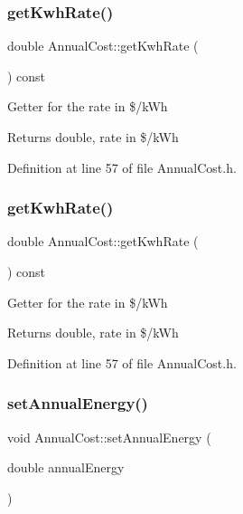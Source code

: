 \subsubsection{\texorpdfstring{get\+Kwh\+Rate()}{getKwhRate()}\hspace{0.1cm}{\footnotesize\ttfamily [2/3]}}
{\footnotesize\ttfamily double Annual\+Cost\+::get\+Kwh\+Rate (\begin{DoxyParamCaption}{ }\end{DoxyParamCaption}) const\hspace{0.3cm}{\ttfamily [inline]}}

Getter for the rate in \$/k\+Wh \begin{DoxyReturn}{Returns}
double, rate in \$/k\+Wh 
\end{DoxyReturn}


Definition at line 57 of file Annual\+Cost.\+h.

\mbox{\label{class_annual_cost_ac01ed415360b6f52f61ec8a581333c29}} 
\subsubsection{\texorpdfstring{get\+Kwh\+Rate()}{getKwhRate()}\hspace{0.1cm}{\footnotesize\ttfamily [3/3]}}
{\footnotesize\ttfamily double Annual\+Cost\+::get\+Kwh\+Rate (\begin{DoxyParamCaption}{ }\end{DoxyParamCaption}) const\hspace{0.3cm}{\ttfamily [inline]}}

Getter for the rate in \$/k\+Wh \begin{DoxyReturn}{Returns}
double, rate in \$/k\+Wh 
\end{DoxyReturn}


Definition at line 57 of file Annual\+Cost.\+h.

\mbox{\label{class_annual_cost_a4379cc7b591abefb2302d74c57227357}} 
\subsubsection{\texorpdfstring{set\+Annual\+Energy()}{setAnnualEnergy()}\hspace{0.1cm}{\footnotesize\ttfamily [1/3]}}
{\footnotesize\ttfamily void Annual\+Cost\+::set\+Annual\+Energy (\begin{DoxyParamCaption}\item[{double}]{annual\+Energy }\end{DoxyParamCaption})\hspace{0.3cm}{\ttfamily [inline]}}


